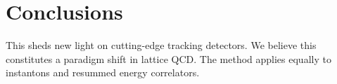 \section{Conclusions}\label{sec:conclusions}

This sheds new light on cutting-edge tracking detectors. We believe this
constitutes a paradigm shift in lattice QCD. The method applies equally
to instantons and resummed energy correlators.

